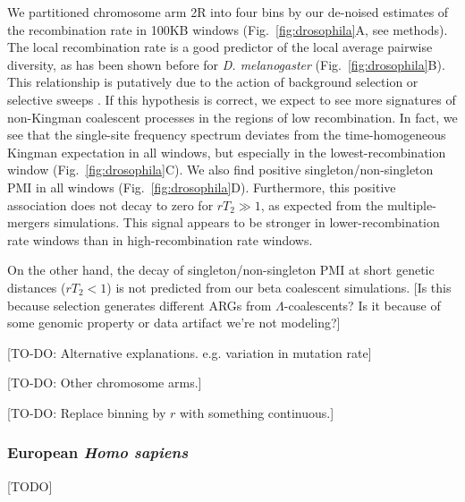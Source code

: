 \documentclass[11pt, letterpaper]{article}   	%
\newcommand{\fig}[1]{Fig.~\ref{#1}}
\begin{document}
We partitioned chromosome arm 2R into four bins by our de-noised estimates of the recombination rate in 100KB windows (\fig{fig:drosophila}A, see methods).
The local recombination rate is a good predictor of the local average pairwise diversity, as has been shown before for \emph{D. melanogaster} (\fig{fig:drosophila}B).
This relationship is putatively due to the action of background selection or selective sweeps \cite{}.
If this hypothesis is correct, we expect to see more signatures of non-Kingman coalescent processes in the regions of low recombination.
In fact, we see that the single-site frequency spectrum deviates from the time-homogeneous Kingman expectation in all windows, but especially in the lowest-recombination window (\fig{fig:drosophila}C).
We also find positive singleton/non-singleton PMI in all windows (\fig{fig:drosophila}D).
Furthermore, this positive association does not decay to zero for $rT_2\gg1$, as expected from the multiple-mergers simulations.
This signal appears to be stronger in lower-recombination rate windows than in high-recombination rate windows.

On the other hand, the decay of singleton/non-singleton PMI at short genetic distances ($rT_2<1$) is not predicted from our beta coalescent simulations.
[Is this because selection generates different ARGs from $\Lambda$-coalescents? Is it because of some genomic property or data artifact we're not modeling?]

[TO-DO: Alternative explanations. e.g. variation in mutation rate]

[TO-DO: Other chromosome arms.]

[TO-DO: Replace binning by $r$ with something continuous.]

\subsubsection{European \textit{Homo sapiens}}
[TODO]
\end{document}
